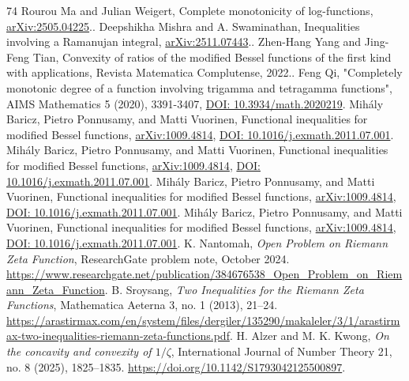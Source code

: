 \begin{thebibliography}{74}
 Rourou Ma and Julian Weigert, Complete monotonicity of log-functions, \href{https://arxiv.org/abs/2505.04225}{arXiv:2505.04225}..
 Deepshikha Mishra and A. Swaminathan, Inequalities involving a Ramanujan integral, \href{https://arxiv.org/abs/2511.07443}{arXiv:2511.07443}..
 Zhen-Hang Yang and Jing-Feng Tian, Convexity of ratios of the modified Bessel functions of the first kind with applications, Revista Matematica Complutense, 2022..
 Feng Qi, "Completely monotonic degree of a function involving trigamma and tetragamma functions", AIMS Mathematics 5 (2020), 3391-3407, \href{https://doi.org/10.3934/math.2020219}{DOI: 10.3934/math.2020219}.
 Mihály Baricz, Pietro Ponnusamy, and Matti Vuorinen, Functional inequalities for modified Bessel functions, \href{https://arxiv.org/abs/1009.4814}{arXiv:1009.4814}, \href{https://doi.org/10.1016/j.exmath.2011.07.001}{DOI: 10.1016/j.exmath.2011.07.001}.
 Mihály Baricz, Pietro Ponnusamy, and Matti Vuorinen, Functional inequalities for modified Bessel functions, \href{https://arxiv.org/abs/1009.4814}{arXiv:1009.4814}, \href{https://doi.org/10.1016/j.exmath.2011.07.001}{DOI: 10.1016/j.exmath.2011.07.001}.
 Mihály Baricz, Pietro Ponnusamy, and Matti Vuorinen, Functional inequalities for modified Bessel functions, \href{https://arxiv.org/abs/1009.4814}{arXiv:1009.4814}, \href{https://doi.org/10.1016/j.exmath.2011.07.001}{DOI: 10.1016/j.exmath.2011.07.001}.
 Mihály Baricz, Pietro Ponnusamy, and Matti Vuorinen, Functional inequalities for modified Bessel functions, \href{https://arxiv.org/abs/1009.4814}{arXiv:1009.4814}, \href{https://doi.org/10.1016/j.exmath.2011.07.001}{DOI: 10.1016/j.exmath.2011.07.001}.
K. Nantomah,
\emph{Open Problem on Riemann Zeta Function},
ResearchGate problem note, October 2024.
\url{https://www.researchgate.net/publication/384676538_Open_Problem_on_Riemann_Zeta_Function}.
B. Sroysang,
\emph{Two Inequalities for the Riemann Zeta Functions},
Mathematica Aeterna 3, no. 1 (2013), 21--24.
\url{https://arastirmax.com/en/system/files/dergiler/135290/makaleler/3/1/arastirmax-two-inequalities-riemann-zeta-functions.pdf}.
H. Alzer and M. K. Kwong,
\emph{On the concavity and convexity of \(1/\zeta\)},
International Journal of Number Theory 21, no. 8 (2025), 1825--1835.
\url{https://doi.org/10.1142/S1793042125500897}.

\end{thebibliography}
